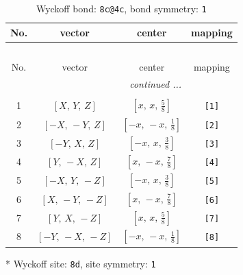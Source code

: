 \documentclass[fleqn,8pt]{jsarticle}
\begin{document}
\renewcommand{\arraystretch}{1.2}
\begin{longtable}{cccc}
\caption{Wyckoff bond: {\tt 8c@4c}, bond symmetry: {\tt 1}}
 \\
 \hline \hline
No. & vector & center & mapping \\ \hline \endfirsthead

\multicolumn{3}{l}{\tablename\ \thetable{}} \\
 \hline \hline
No. & vector & center & mapping \\ \hline \endhead

 \hline \hline
\multicolumn{3}{r}{\footnotesize\it continued ...} \\ \endfoot

 \hline \hline
\multicolumn{3}{r}{} \\ \endlastfoot

1 & $\left[ X,\, Y,\, Z \right]$ & $\left[ x,\, x,\, \frac{5}{8} \right]$ & {\tt [1]} \\ \hline
2 & $\left[ - X,\, - Y,\, Z \right]$ & $\left[ - x,\, - x,\, \frac{1}{8} \right]$ & {\tt [2]} \\ \hline
3 & $\left[ - Y,\, X,\, Z \right]$ & $\left[ - x,\, x,\, \frac{3}{8} \right]$ & {\tt [3]} \\ \hline
4 & $\left[ Y,\, - X,\, Z \right]$ & $\left[ x,\, - x,\, \frac{7}{8} \right]$ & {\tt [4]} \\ \hline
5 & $\left[ - X,\, Y,\, - Z \right]$ & $\left[ - x,\, x,\, \frac{3}{8} \right]$ & {\tt [5]} \\ \hline
6 & $\left[ X,\, - Y,\, - Z \right]$ & $\left[ x,\, - x,\, \frac{7}{8} \right]$ & {\tt [6]} \\ \hline
7 & $\left[ Y,\, X,\, - Z \right]$ & $\left[ x,\, x,\, \frac{5}{8} \right]$ & {\tt [7]} \\ \hline
8 & $\left[ - Y,\, - X,\, - Z \right]$ & $\left[ - x,\, - x,\, \frac{1}{8} \right]$ & {\tt [8]} \\
\end{longtable}
* Wyckoff site: {\tt 8d}, site symmetry: {\tt 1}
\renewcommand{\arraystretch}{1.2}
\end{document}
